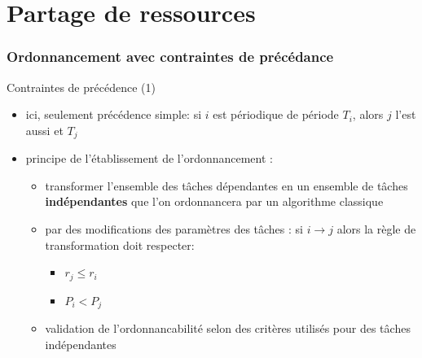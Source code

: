%                                                                                                               
%
%

\part{Partage de ressources}

\section{Ordonnancement avec contraintes de précédance}

\begin{frame}{Contraintes de précédence (1)} 
  \begin{itemize}
  \item ici,  seulement précédence simple: si $i$  est périodique de
    période $T_i$, alors $j$ l'est aussi et $T_j$
  \item principe de l'établissement de l'ordonnancement :
    \begin{itemize} 
    \item transformer l'ensemble des tâches dépendantes en un ensemble
      de  tâches \textbf{indépendantes} que  l'on ordonnancera  par un
      algorithme classique
    \item par des modifications des  paramètres des tâches : si $i →
      j$ alors la règle de transformation doit respecter:
      \begin{itemize} 
      \item $r_j ≤ r_i$
      \item $P_i < P_j$
      \end{itemize} 
    \item  validation  de   l'ordonnancabilité  selon  des  critères
      utilisés pour des tâches indépendantes
    \end{itemize}
  \end{itemize}
\end{frame}

